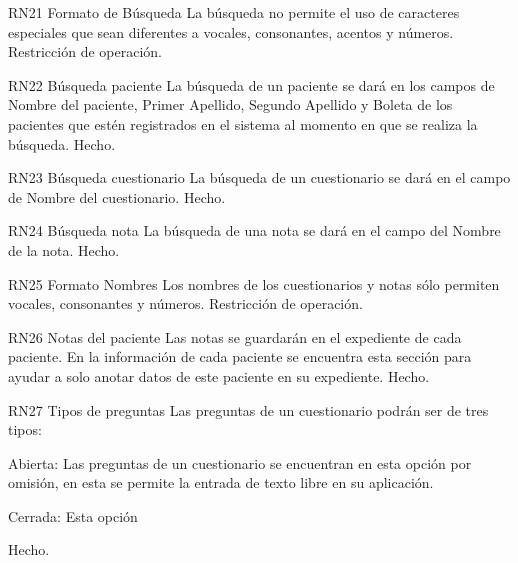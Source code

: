 \begin{BussinesRule}{RN21}{ Formato de Búsqueda}
\BRitem[Descripción:] La búsqueda no permite el uso de caracteres especiales que sean diferentes a vocales, consonantes, acentos y números. 
\BRitem[Tipo:] Restricción de operación.
\end{BussinesRule}

\begin{BussinesRule}{RN22}{ Búsqueda paciente}
\BRitem[Descripción:] La búsqueda de un paciente se dará en los campos de Nombre del paciente, Primer Apellido, Segundo Apellido y Boleta de los pacientes que estén registrados en el sistema al momento en que se realiza la búsqueda.
\BRitem[Tipo:] Hecho.
\end{BussinesRule}

\begin{BussinesRule}{RN23}{ Búsqueda cuestionario}
\BRitem[Descripción:] La búsqueda de un cuestionario se dará en el campo de Nombre del cuestionario.
\BRitem[Tipo:] Hecho.
\end{BussinesRule}

\begin{BussinesRule}{RN24}{ Búsqueda nota}
\BRitem[Descripción:] La búsqueda de una nota se dará en el campo del Nombre de la nota.
\BRitem[Tipo:] Hecho.
\end{BussinesRule}

\begin{BussinesRule}{RN25}{ Formato Nombres}
\BRitem[Descripción:] Los nombres de los cuestionarios y notas sólo permiten vocales, consonantes y números.
\BRitem[Tipo:] Restricción de operación.
\end{BussinesRule}

\begin{BussinesRule}{RN26}{ Notas del paciente}
\BRitem[Descripción:] Las notas se guardarán en el expediente de cada paciente. En la información de cada paciente se encuentra esta sección para ayudar a solo anotar datos de este paciente en su expediente.
\BRitem[Tipo:] Hecho.
\end{BussinesRule}

\begin{BussinesRule}{RN27}{ Tipos de preguntas}
\BRitem[Descripción:] Las preguntas de un cuestionario podrán ser de tres tipos:
	\begin{itemizate}
		\item Abierta: Las preguntas de un cuestionario se encuentran en esta opción por omisión, en esta se permite la entrada de texto libre en su aplicación.
		\item Cerrada: Esta opción 
	\end{itemizate}
\BRitem[Tipo:] Hecho.
\end{BussinesRule}

